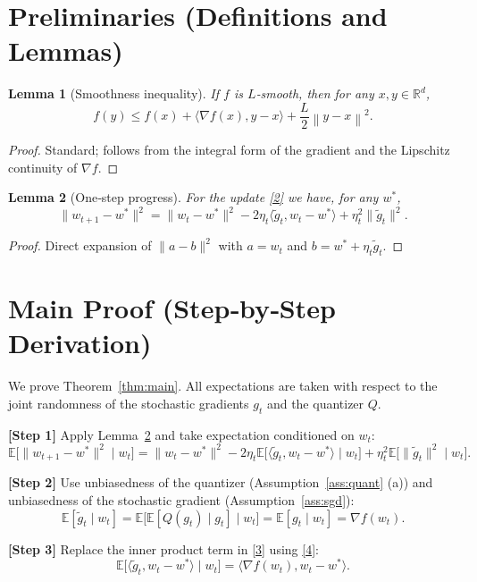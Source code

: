 \documentclass{article}
\newtheorem{lemma}{Lemma}
\newcommand{\E}{\mathbb{E}}
\newcommand{\R}{\mathbb{R}}
\newcommand{\norm}[1]{\left\lVert#1\right\rVert}
\begin{document}
\newpage
\section*{Preliminaries (Definitions and Lemmas)}
\begin{lemma}[Smoothness inequality]\label{lem:smooth}
If $f$ is $L$‑smooth, then for any $x,y\in\R^{d}$,
\[
f(y)\le f(x)+\langle\nabla f(x),y-x\rangle+\frac{L}{2}\norm{y-x}^{2}.
\]
\end{lemma}
\begin{proof}
Standard; follows from the integral form of the gradient and the Lipschitz continuity of $\nabla f$.
\end{proof}

\begin{lemma}[One‑step progress]\label{lem:one_step}
For the update \eqref{2} we have, for any $w^{*}$,
\[
\|w_{t+1}-w^{*}\|^{2}
= \|w_{t}-w^{*}\|^{2}
-2\eta_{t}\langle\tilde g_{t},w_{t}-w^{*}\rangle
+\eta_{t}^{2}\|\tilde g_{t}\|^{2}.
\]
\end{lemma}
\begin{proof}
Direct expansion of $\|a-b\|^{2}$ with $a=w_{t}$ and $b=w^{*}+\eta_{t}\tilde g_{t}$.
\end{proof}

\section*{Main Proof (Step‑by‑Step Derivation)}
We prove Theorem~\ref{thm:main}.  
All expectations are taken with respect to the joint randomness of the stochastic gradients $g_{t}$ and the quantizer $Q$.

\bigskip
\noindent\textbf{[Step 1]} Apply Lemma~\ref{lem:one_step} and take expectation conditioned on $w_{t}$:
\[
\E\!\bigl[\|w_{t+1}-w^{*}\|^{2}\mid w_{t}\bigr]
= \|w_{t}-w^{*}\|^{2}
-2\eta_{t}\E\!\bigl[\langle\tilde g_{t},w_{t}-w^{*}\rangle\mid w_{t}\bigr]
+\eta_{t}^{2}\E\!\bigl[\|\tilde g_{t}\|^{2}\mid w_{t}\bigr].
\tag{3}
\]

\noindent\textbf{[Step 2]} Use unbiasedness of the quantizer (Assumption~\ref{ass:quant} (a)) and unbiasedness of the stochastic gradient (Assumption~\ref{ass:sgd}):
\[
\E[\tilde g_{t}\mid w_{t}]
= \E\!\bigl[\E[Q(g_{t})\mid g_{t}]\mid w_{t}\bigr]
= \E[g_{t}\mid w_{t}]
= \nabla f(w_{t}).
\tag{4}
\]

\noindent\textbf{[Step 3]} Replace the inner product term in \eqref{3} using \eqref{4}:
\[
\E\!\bigl[\langle\tilde g_{t},w_{t}-w^{*}\rangle\mid w_{t}\bigr]
= \langle\nabla f(w_{t}),w_{t}-w^{*}\rangle .
\tag{5}
\]
\end{document}
